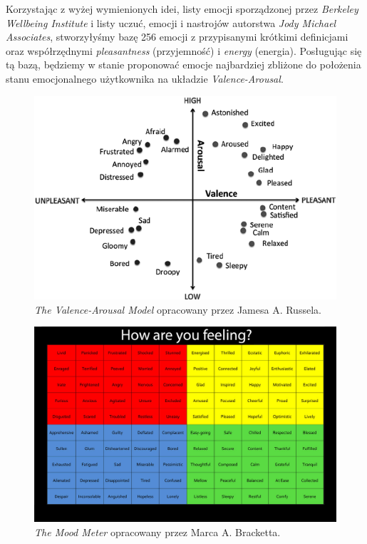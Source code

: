 \documentclass[inz, shortabstract]{iithesis}
\begin{document}
Korzystając z wyżej wymienionych idei, listy emocji sporządzonej przez \textit{Berkeley Wellbeing Institute}\cite{berkeley} i listy uczuć, emocji i nastrojów autorstwa \textit{Jody Michael Associates}\cite{jma}, stworzyłyśmy bazę 256 emocji z przypisanymi krótkimi definicjami oraz współrzędnymi \textit{pleasantness} (przyjemność) i \textit{energy} (energia). Posługując się tą bazą, będziemy w stanie proponować emocje najbardziej zbliżone do położenia stanu emocjonalnego użytkownika na układzie \textit{Valence-Arousal}.

\begin{figure}
\includegraphics[width=1\textwidth]{Russells-Valence-Arousal-Model.png} 
\caption{\textit{The Valence-Arousal Model} opracowany przez Jamesa A. Russela.\cite{2dmodel}}
\end{figure}

\begin{figure}
\includegraphics[width=1\textwidth]{mood-meter.jpg} 
\caption{\textit{The Mood Meter} opracowany przez Marca A. Bracketta.\cite{moodmeter}}
\end{figure}
\end{document}
